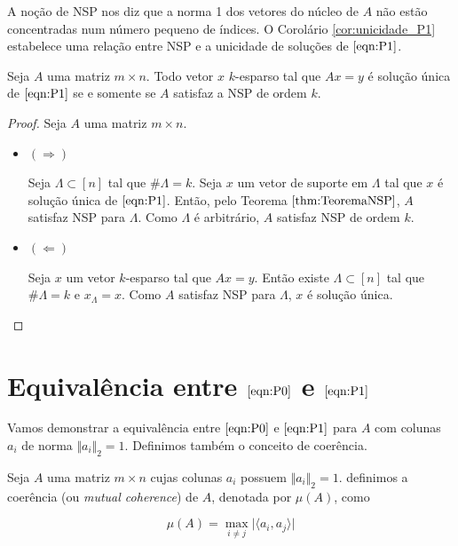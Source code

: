 A noção de NSP nos diz que a norma 1 dos vetores do núcleo de $A$ não estão concentradas num número pequeno de índices. O Corolário \ref{cor:unicidade_P1} estabelece uma relação entre NSP e a unicidade de soluções de $\eqref{eqn:P1}$.

\begin{corolario}
\label{cor:unicidade_P1}
Seja $A$ uma matriz $m \times n$. Todo vetor $x$ $k$-esparso tal que $Ax = y$ é solução única de $\eqref{eqn:P1}$ se e somente se $A$ satisfaz a NSP de ordem $k$.
\end{corolario}
\begin{proof}
Seja $A$ uma matriz $m \times n$.
\begin{itemize}

\item $( \Rightarrow )$

Seja $\Lambda \subset [n]$ tal que $\# \Lambda = k$. Seja $x$ um vetor de suporte em $\Lambda$ tal que $x$ é solução única de $\eqref{eqn:P1}$. Então, pelo Teorema $\ref{thm:TeoremaNSP}$, $A$ satisfaz NSP para $\Lambda$. Como $\Lambda$ é arbitrário, $A$ satisfaz NSP de ordem $k$.

\item $( \Leftarrow )$

Seja $x$ um vetor $k$-esparso tal que $Ax = y$. Então existe $\Lambda \subset [n]$ tal que $\# \Lambda = k$ e $x_{\Lambda} = x$. Como $A$ satisfaz NSP para $\Lambda$, $x$ é solução única.
\end{itemize}
\end{proof}

\section{Equivalência entre $\eqref{eqn:P0}$ e $\eqref{eqn:P1}$}
Vamos demonstrar a equivalência entre $\eqref{eqn:P0}$ e $\eqref{eqn:P1}$ para $A$ com colunas $a_i$ de norma $\Vert a_i \Vert_2 = 1$. Definimos também o conceito de coerência.

\begin{definicao}
Seja $A$ uma matriz $m \times n$ cujas colunas $a_i$ possuem $\Vert a_i \Vert_2 = 1$. definimos a coerência (ou \textit{mutual coherence}) de $A$, denotada por $\mu(A)$, como


$$\mu(A) = \max_{i \neq j} \vert \langle a_i, a_j \rangle \vert$$
\end{definicao}

